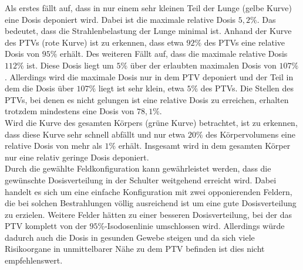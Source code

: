 Als erstes fällt auf, dass in nur einem sehr kleinen Teil der Lunge (gelbe Kurve) eine Dosis deponiert wird. Dabei ist die maximale relative Dosis
$5,2 \%$. Das bedeutet, dass die Strahlenbelastung der Lunge minimal ist.
Anhand der Kurve des PTVs (rote Kurve) ist zu erkennen, dass etwa $92\%$ des PTVs eine relative Dosis von $95\%$ erhält. Des weiteren Fällt auf,
dass die maximale relative Dosis $112\%$ ist. Diese Dosis liegt um $5\%$ über der erlaubten maximalen Dosis von $107\%$ \cite{ICRU}.
Allerdings wird die maximale Dosis nur in dem PTV deponiert und der Teil in dem die Dosis über $107\%$ liegt ist sehr klein, etwa $5\%$ des PTVs.
Die Stellen des PTVs, bei denen es nicht gelungen ist eine relative Dosis zu erreichen, erhalten
trotzdem mindestens eine Dosis von $78,1\%$. \\
Wird die Kurve des gesamten Körpers (grüne Kurve) betrachtet, ist zu erkennen, dass diese Kurve sehr schnell abfällt und nur etwa $20\%$ des
Körpervolumens eine relative Dosis von mehr als $1\%$ erhält. Insgesamt wird in dem gesamten Körper nur eine relativ geringe Dosis deponiert. \\

Durch die gewählte Feldkonfiguration kann gewährleistet werden, dass die gewünschte Dosisverteilung
in der Schulter weitgehend erreicht wird. Dabei handelt es sich um eine einfache Konfiguration
mit zwei opponierenden Feldern, die bei solchen Bestrahlungen völlig ausreichend ist um eine gute Dosisverteilung zu erzielen.
Weitere Felder hätten zu einer besseren Dosisverteilung,
bei der das PTV komplett von der $95\%$-Isodosenlinie umschlossen wird. Allerdings würde dadurch auch
die Dosis in gesunden Gewebe steigen und da sich viele Risikoorgane in unmittelbarer Nähe zu dem
PTV befinden ist dies nicht empfehlenswert.
